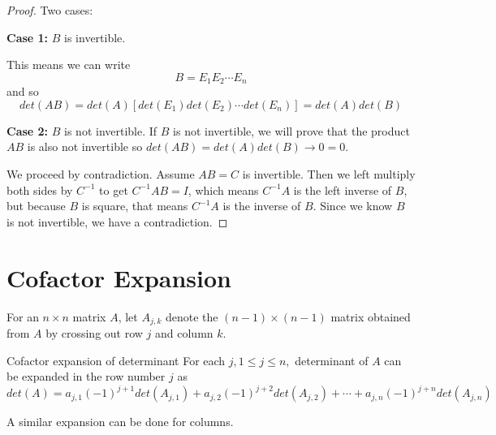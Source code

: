 \begin{proof}
Two cases: 

\textbf{Case 1: } $B$ is invertible. 

This means we can write 
$$B = E_{1} E_{2} \cdots E_{n}$$
and so 
$$det(AB) = det(A)[det(E_{1}) det(E_{2}) \cdots det(E_{n})] = det(A) det(B)$$

\textbf{Case 2: } $B$ is not invertible. 
If $B$ is not invertible, we will prove that the product $AB$ is also not invertible so $det(AB) = det(A) det(B) \rightarrow 0 = 0$. 

We proceed by contradiction. Assume $AB = C$ is invertible. Then we left multiply both sides by $C^{-1}$ to get $C^{-1} AB = I$, which means $C^{-1}A$ is the left inverse of $B$, but because $B$ is square, that means $C^{-1}A$ is the inverse of $B$. Since we know $B$ is not invertible, we have a contradiction. 
\end{proof}

\section{Cofactor Expansion}

For an $n \times n$ matrix $A$, let $A_{j, k}$ denote the $(n - 1) \times (n - 1)$ matrix obtained from $A$ by crossing out row $j$ and column $k$. 

\begin{theorem}{Cofactor expansion of determinant}
For each $j, 1 \leq j \leq n,$ determinant of $A$ can be expanded in the row number $j$ as 
$$det(A) = a_{j, 1} (-1)^{j+1} det(A_{j, 1}) + a_{j, 2} (-1)^{j+2} det(A_{j, 2}) + \cdots + a_{j, n} (-1)^{j + n} det(A_{j, n})$$

A similar expansion can be done for columns. 
\end{theorem}

